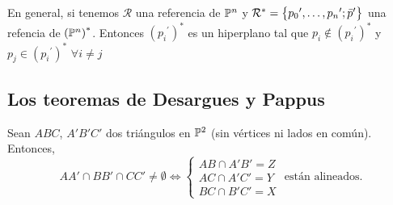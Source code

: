 \begin{obs}
En general, si tenemos $\mathcal{R}$ una referencia de $\mathbb{P}^n$ y 
$\mathcal{R}^* = \left\{{p_0}^\prime,\dots,{p_n}^\prime; \bar{p}^\prime\right\}$
una refencia de $\left( \mathbb{P}^n \right)^*$. Entonces $\left( {p_i}^\prime \right)^*$
es un hiperplano tal que $p_i \notin \left( {p_i}^\prime \right)^*$ y
$p_j \in \left( {p_i}^\prime \right)^*$ $\forall i \neq j$
\end{obs}


\subsection{Los teoremas de Desargues y Pappus}

\begin{thm}[de Desargues]

Sean $ABC$, $A'B'C'$ dos triángulos en $\mathbb{P}^2$ (sin vértices ni lados en común). Entonces,
\[
AA' \cap BB' \cap CC' \neq \emptyset \iff
\begin{cases}
AB \cap A'B' = Z \\
AC \cap A'C' = Y \\
BC \cap B'C' = X
\end{cases}
\text{ están alineados.}
\]


\end{thm}
